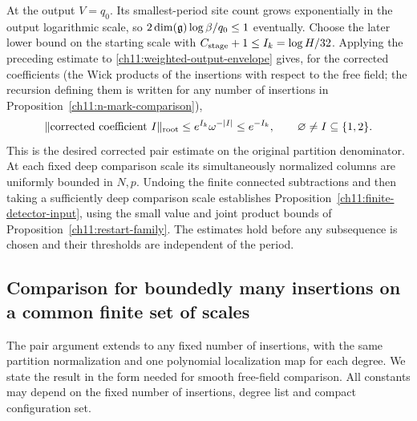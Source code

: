 At the output $V=q_0$. Its smallest-period site count grows
exponentially in the output logarithmic scale, so
$2\dim(\mathfrak g)\log\beta/q_0\le1$ eventually.
Choose the later lower bound on the starting scale with
$C_{\rm stage}+1\le I_k=\log H/32$.
Applying the preceding estimate to
\eqref{ch11:weighted-output-envelope} gives, for the corrected coefficients (the Wick products of the insertions with respect to the free field; the recursion defining them is written for any number of insertions in Proposition~\ref{ch11:n-mark-comparison}),
\[
 \|\hbox{corrected coefficient }I\|_{\rm root}
 \le e^{I_k}\omega^{-|I|}
 \le e^{-I_k},\qquad \varnothing\ne I\subseteq\{1,2\}.
\]
This is the desired corrected pair estimate on the original
partition denominator. At each fixed deep comparison scale its
simultaneously normalized columns are uniformly bounded in $N,p$.
Undoing the finite connected subtractions and then taking a
sufficiently deep comparison scale establishes
Proposition~\ref{ch11:finite-detector-input}, using the small value and joint product bounds of
Proposition~\ref{ch11:restart-family}. The estimates hold before any subsequence is chosen and their
thresholds are independent of the period.


\subsection{Comparison for boundedly many insertions on a common finite set of scales}
\label{ch11:finite-arity-comparison}

The pair argument extends to any fixed number of insertions, with the same
partition normalization and one polynomial localization map for each degree.
We state the result in the form needed for smooth free-field
comparison. All constants may depend on the fixed number of insertions,
degree list and compact configuration set.

